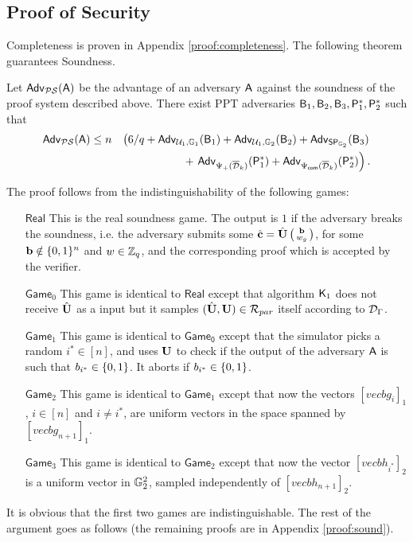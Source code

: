 %


\subsection{Proof of Security}

Completeness is proven in Appendix \ref{proof:completeness}.
The following theorem guarantees Soundness. 
 
\begin{theorem} Let $\mathsf{Adv}_{\mathcal{PS}}(\mathsf{A})$ 
be the advantage of an adversary $\mathsf{A}$ against the soundness of 
the proof system  described above. There exist PPT adversaries
$\mathsf{B}_1,\mathsf{B}_2,\mathsf{B}_3,\mathsf{P}^*_1,\mathsf{P}^*_2$ such that 
\begin{eqnarray*}
\mathsf{Adv}_{\mathcal{PS}}(\mathsf{A}) & \leq 
n& \left(6/q+ \mathsf{Adv}_{\mathcal{U}_1,\mathbb{G}_1}(\mathsf{B}_1)
+  \mathsf{Adv}_{\mathcal{U}_1,\mathbb{G}_2}(\mathsf{B}_2)
+  \mathsf{Adv}_{\mathsf{SP}_{\mathbb{G}_2}}(\mathsf{B}_3)\right. \\
& & \mbox{ } 
+  \left.\mathsf{Adv}_{{\Psi_{+}(\overline{\mathcal{D}}_k)}}(\mathsf{P}^*_1)
+
 \mathsf{Adv}_{{{\Psi_{\mathsf{com}}(\overline{\mathcal{D}}_k)}}}(\mathsf{P}^*_2)\right).
\end{eqnarray*}
\label{teo:bitstr-soundness}
\end{theorem}

The proof follows from the indistinguishability of the following games:
\begin{itemize}
\item [$\mathsf{Real}$] This is the real soundness game. 
 The output is $1$ if  the adversary breaks the soundness,
i.e. the adversary submits
some ${\hat{\mathbf{c}}} = {\hat{\mathbf{{U}}}}\left(\begin{smallmatrix}\mathbf{b}\\ w_g\end{smallmatrix}\right)$, for some
$\mathbf{b}\notin \{0,1\}^n$ and $w \in \mathbb{Z}_q$, and
the corresponding proof which is accepted by the verifier.
\item[$\mathsf{Game}_0$] This game is identical to 
$\mathsf{Real}$ except that algorithm $\mathsf{K}_1$ does not receive ${\hat{\mathbf{{U}}}}$ as a input but it samples
$({\hat{\mathbf{{U}}}},\mathbf{{U}}) \in \mathcal{R}_{par}$
itself according to $\mathcal{D}_{\Gamma}$.
\item[$\mathsf{Game}_1$] This game is identical to 
$\mathsf{Game_0}$ except that the simulator picks a random $i^* \in [n]$, and uses $\mathbf{{U}}$ to check  
    if the output of the adversary $\mathsf{A}$ is such that 
    $b_{i^*}\in \{0,1\}$.  It aborts if  $b_{i^*}\in \{0,1\}$.
\item[$\mathsf{Game}_{2}$] This game is identical to 
$\mathsf{Game}_1$ except that now the vectors $[vecb{g}_{i}]_1$, $i \in [n]$ and $i \neq i^*$,
are uniform vectors in the space spanned by $[vecb{g}_{n+1}]_1$.   
\item[$\mathsf{Game}_{3}$] This game is identical to 
$\mathsf{Game}_2$ except that now the vector $[vecb{h}_{i^*}]_2$ is 
a uniform vector in $\mathbb{G}_2^2$, sampled independently of 
$[vecb{h}_{n+1}]_2$.     
\end{itemize}
It is obvious that the first two games are indistinguishable. 
The rest of the argument goes as follows (the remaining proofs are in Appendix \ref{proof:sound}). 

